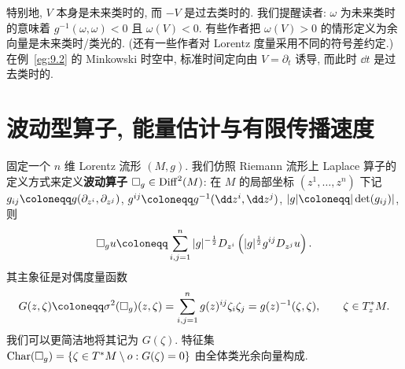 特别地, $V$ 本身是未来类时的, 而 $-V$ 是过去类时的. 我们提醒读者: $\omega$ 为未来类时的意味着 $g^{-1}(\omega, \omega) < 0$ 且 $\omega(V) < 0$. 有些作者把 $\omega(V) > 0$ 的情形定义为余向量是未来类时/类光的. (还有一些作者对 Lorentz 度量采用不同的符号差约定.) 在例~\ref{eg:9.2} 的 Minkowski 时空中, 标准时间定向由 $V = \partial_t$ 诱导, 而此时 $\dd t$ 是过去类时的.

\section{波动型算子, 能量估计与有限传播速度}\label{sec:9.2}
%
%
%

固定一个 $n$ 维 Lorentz 流形 $(M, g)$. 我们仿照 Riemann 流形上 Laplace 算子的定义方式来定义\textbf{波动算子} $\Box_g \in \operatorname{Diff}^2(M)$: 在 $M$ 的局部坐标 $(z^1, \ldots, z^n)$ 下记 $g_{ij} \defeq g(\partial_{z^i}, \partial_{z^j})$, $g^{ij} \defeq g^{-1}(\dd z^i, \dd z^j)$, $|g| \defeq |\det(g_{ij})|$, 则
\begin{equation}\label{eq:9.6}
    \Box_g u \defeq \sum_{i,j=1}^{n} |g|^{-\frac12} D_{z^i}\left( |g|^{\frac12} g^{ij} D_{z^j} u \right).
\end{equation}
其主象征是对偶度量函数
\begin{equation}\label{eq:9.7}
    G(z, \zeta) \defeq \sigma^2(\Box_g)(z, \zeta) = \sum_{i,j=1}^{n} g(z)^{ij} \zeta_i \zeta_j = g(z)^{-1}(\zeta, \zeta), \qquad \zeta \in T_z^* M.
\end{equation}
我们可以更简洁地将其记为 $G(\zeta)$. 特征集 $\operatorname{Char}(\Box_g) = \{\zeta \in T^* M \setminus o : G(\zeta) = 0\}$ 由全体类光余向量构成.

